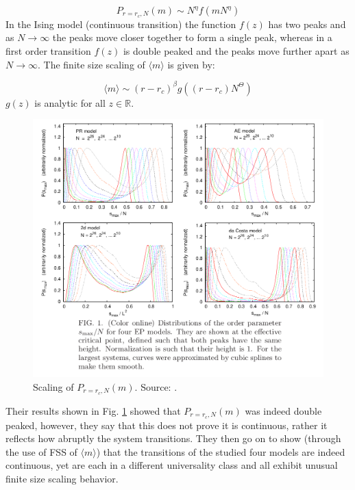 \begin{equation}
	P_{r=r_c, N}(m) \sim N^\eta f(m N^\eta)
\end{equation}
In the Ising model (continuous transition) the function $f(z)$ has two peaks and as $N \rightarrow \infty$ the peaks move closer together to form a single peak, whereas in a first order transition $f(z)$ is double peaked and the peaks move further apart as $N \rightarrow \infty$.
The finite size scaling of $\langle m \rangle$ is given by:

\begin{equation}
	\langle m \rangle \sim (r - r_c)^\beta g((r - r_c) N^\Theta)
\end{equation}
$g(z)$ is analytic for all $z \in \mathbb{R}$.

\begin{figure}[H]
	\centering
	\includegraphics[width=350pt]{images/grassberger_scaling.png}
	\caption{Scaling of $P_{r=r_c, N}(m)$. Source: \cite{Grassberger_1}.}
	\label{fig:grassberger_scaling}
\end{figure}

Their results shown in Fig. \ref{fig:grassberger_scaling} showed that $P_{r=r_c, N}(m)$ was indeed double peaked, however, they say that this does not prove it is continuous, rather it reflects how abruptly the system transitions.
They then go on to show (through the use of FSS of $\langle m \rangle$) that the transitions of the studied four models are indeed continuous, yet are each in a different universality class and all exhibit unusual finite size scaling behavior.



